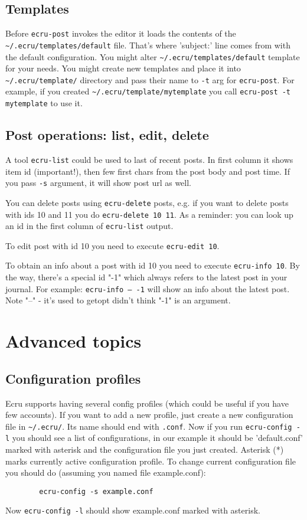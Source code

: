 \documentclass{article}
\begin{document}
	\subsection{Templates}
	Before {\tt ecru-post} invokes the editor it loads the contents of the {\tt \verb+~+/.ecru/templates/default} file. 
	That's where 'subject:' line comes from with the default configuration. You might alter 
	{\tt \verb+~+/.ecru/templates/default} template for your needs. You might create new templates and place it into
	{\tt \verb+~+/.ecru/template/} directory and pass their name to {\tt -t} arg for {\tt ecru-post}. For example,
	if you created {\tt \verb+~+/.ecru/template/mytemplate} you call {\tt ecru-post -t mytemplate} to use it.

	\subsection{Post operations: list, edit, delete}
	A tool {\tt ecru-list} could be used to last of recent posts. In first column it shows item id (important!),
	then few first chars from the post body and post time. If you pass {\tt -s} argument, it will show post url
	as well.

	You can delete posts using {\tt ecru-delete} posts, e.g. if you want to delete posts with ids 10 and 11 you
	do {\tt ecru-delete 10 11}. As a reminder: you can look up an id in the first column of {\tt ecru-list} 
	output.

	To edit post with id 10 you need to execute {\tt ecru-edit 10}. 

	To obtain an info about a post with id 10 you need to execute {\tt ecru-info 10}. By the way, there's a special
	id "-1" which always refers to the latest post in your journal. For example: {\tt ecru-info -- -1} will
	show an info about the latest post. Note "--" - it's used to getopt didn't think "-1" is an argument.
     \section{Advanced topics}
       \subsection{Configuration profiles}
	Ecru supports having several config profiles (which could be useful if you have few accounts). If you want to
	add a new profile, just create a new configuration file in {\tt \verb+~+/.ecru/}. Its name should end with
	{\tt .conf}. 
	Now if you run {\tt ecru-config -l} you should see a list of configurations, in our example it should be
	'default.conf' marked with asterisk and the configuration file you just created. Asterisk (*) marks
	currently active configuration profile. To change current configuration file you should do (assuming
	you named file example.conf): 
	\begin{verbatim}
		ecru-config -s example.conf
	\end{verbatim}

	Now {\tt ecru-config -l} should show example.conf marked with asterisk.
\end{document}
